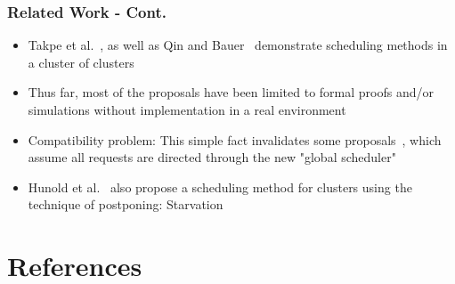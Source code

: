 \documentclass[red, cover=invisible, theme=Warsaw]{myslides}
\begin{document}
\begin{frame}\frametitle{Related Work - Cont.}
  \begin{itemize}
    \item Takpe et al.~\cite{Suter07}, as well as Qin and Bauer~\cite{Bauer07} demonstrate scheduling methods in a cluster of clusters
    \item Thus far, most of the proposals have been limited to formal proofs and/or simulations without implementation in a real environment
    \item Compatibility problem: This simple fact invalidates some proposals~\cite{Antonio09,Chau03}, which assume all requests are directed through the new "global scheduler"
    \item Hunold et al.~\cite{Rauber08} also propose a scheduling method for clusters using the technique of postponing: Starvation
  \end{itemize}
\end{frame}

\section{References}

	  \begin{tiny}	  
	  
	  
	  \end{tiny}

\end{document}
